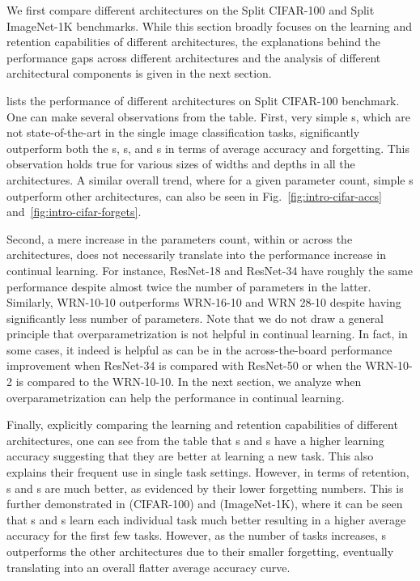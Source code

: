 We first compare different architectures on the Split CIFAR-100 and Split ImageNet-1K benchmarks. While this section broadly focuses on the learning and retention capabilities of different architectures, the explanations behind the performance gaps across different architectures and the analysis of different architectural components is given in the next section.  

 lists the performance of different architectures on Split CIFAR-100 benchmark. One can make several observations from the table. First, very simple \CNN s, which are not state-of-the-art in the single image classification tasks, significantly outperform both the \ResNet s, \WRN s, and \ViT s in terms of average accuracy and forgetting. This observation holds true for various sizes of widths and depths in all the architectures. A similar overall trend, where for a given parameter count, simple \CNN s outperform other architectures, can also be seen in Fig.~\ref{fig:intro-cifar-accs} and~\ref{fig:intro-cifar-forgets}.

Second, a mere increase in the parameters count, within or across the architectures, does not necessarily translate into the performance increase in continual learning. For instance, ResNet-18 and ResNet-34 have roughly the same performance despite almost twice the number of parameters in the latter. Similarly, WRN-10-10 outperforms WRN-16-10 and WRN 28-10 despite having significantly less number of parameters. Note that we do not draw a general principle that overparametrization is not helpful in continual learning. In fact, in some cases, it indeed is helpful as can be in the across-the-board performance improvement when ResNet-34 is compared with ResNet-50 or when the WRN-10-2 is compared to the WRN-10-10. In the next section, we analyze when overparametrization can help the performance in continual learning. 


Finally, explicitly comparing the learning and retention capabilities of different architectures, one can see from the table that \ResNet s and \WRN s have a higher learning accuracy suggesting that they are better at learning a new task. This also explains their frequent use in single task settings. However, in terms of retention, \CNN s and \ViT s are much better, as evidenced by their lower forgetting numbers. This is further demonstrated in  (CIFAR-100) and  (ImageNet-1K), where it can be seen that \ResNet s and \WRN s learn each individual task much better resulting in a higher average accuracy for the first few tasks. However, as the number of tasks increases, \CNN s outperforms the other architectures due to their smaller forgetting, eventually translating into an overall flatter average accuracy curve.

